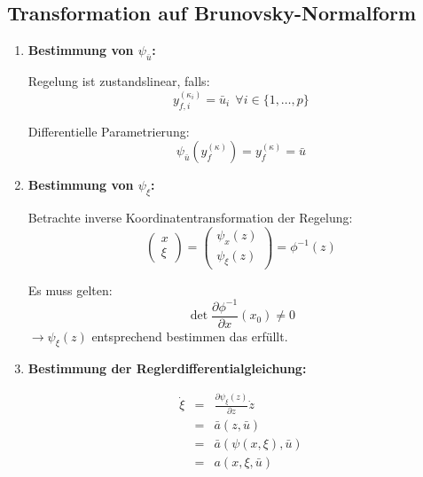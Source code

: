 \subsection{Transformation auf Brunovsky-Normalform}
\begin{enumerate}
    \item
        \textbf{Bestimmung von $\psi_{\bar{u}}$:}

        Regelung ist zustandslinear, falls:
        \begin{equation}
            y_{f,i}^{(\kappa_i)} = \bar{u}_i\ \ \forall i \in \{1, \ldots, p\}
        \end{equation}

        Differentielle Parametrierung:
        \begin{equation}
            \psi_{\bar{u}}(y_f^{(\kappa)}) = y_f^{(\kappa)} = \bar{u} 
        \end{equation}
    \item
        \textbf{Bestimmung von $\psi_\xi$:}

        Betrachte inverse Koordinatentransformation der Regelung:
        \begin{equation}
            \begin{pmatrix} x \\ \xi \end{pmatrix} =
            \begin{pmatrix} \psi_x(z) \\ \psi_\xi(z) \end{pmatrix} =
            \phi^{-1}(z)        
        \end{equation}

        Es muss gelten:
        \begin{equation}
            \det \frac{\partial \phi^{-1}}{\partial x}(x_0) \neq 0
        \end{equation}
        $\rightarrow \psi_\xi(z)$ entsprechend bestimmen das erfüllt.
    \item
        \textbf{Bestimmung der Reglerdifferentialgleichung:}

        \begin{eqnarray}
            \dot{\xi} &=& \frac{\partial \psi_\xi(z)}{\partial z} \dot{z} \\
                &=& \bar{a}(z, \bar{u}) \\
                &=& \bar{a}(\psi(x, \xi), \bar{u}) \\
                &=& a(x, \xi, \bar{u})
        \end{eqnarray}
        

\end{enumerate}
